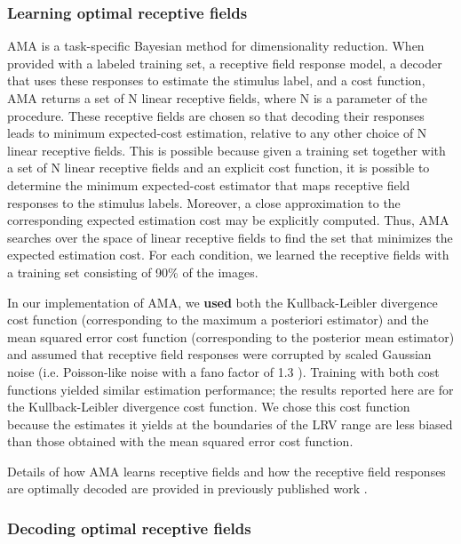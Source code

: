 \documentclass{jov}
\providecommand{\DIFaddtex}[1]{{\bf #1}} %
\providecommand{\DIFdeltex}[1]{} %
\providecommand{\DIFaddbegin}{} %
\providecommand{\DIFaddend}{} %
\providecommand{\DIFdelbegin}{} %
\providecommand{\DIFdelend}{} %
\providecommand{\DIFadd}[1]{\texorpdfstring{\DIFaddtex{#1}}{#1}} %
\providecommand{\DIFdel}[1]{\texorpdfstring{\DIFdeltex{#1}}{}} %
\newcommand{\DIFscaledelfig}{0.5}
\newlength{\DIFdelgraphicswidth} %
\newlength{\DIFdelgraphicsheight} %
\newcommand{\DIFaddincludegraphics}[2][]{{\color{blue}\fbox{\DIFOincludegraphics[#1]{#2}}}} %
\newcommand{\DIFdelincludegraphics}[2][]{%
\sbox{\DIFdelgraphicsbox}{\DIFOincludegraphics[#1]{#2}}%
\settoboxwidth{\DIFdelgraphicswidth}{\DIFdelgraphicsbox} %
\settoboxtotalheight{\DIFdelgraphicsheight}{\DIFdelgraphicsbox} %
\scalebox{\DIFscaledelfig}{%
\parbox[b]{\DIFdelgraphicswidth}{\usebox{\DIFdelgraphicsbox}\\[-\baselineskip] \rule{\DIFdelgraphicswidth}{0em}}\llap{\resizebox{\DIFdelgraphicswidth}{\DIFdelgraphicsheight}{%
\setlength{\unitlength}{\DIFdelgraphicswidth}%
\begin{picture}(1,1)%
\thicklines\linethickness{2pt} %
{\color[rgb]{1,0,0}\put(0,0){\framebox(1,1){}}}%
{\color[rgb]{1,0,0}\put(0,0){\line( 1,1){1}}}%
{\color[rgb]{1,0,0}\put(0,1){\line(1,-1){1}}}%
\end{picture}%
}\hspace*{3pt}}} %
} %
\DeclareRobustCommand{\DIFaddbegin}{\DIFOaddbegin \let\includegraphics\DIFaddincludegraphics} %
\DeclareRobustCommand{\DIFaddend}{\DIFOaddend \let\includegraphics\DIFOincludegraphics} %
\DeclareRobustCommand{\DIFdelbegin}{\DIFOdelbegin \let\includegraphics\DIFdelincludegraphics} %
\DeclareRobustCommand{\DIFdelend}{\DIFOaddend \let\includegraphics\DIFOincludegraphics} %
\begin{document}
\subsubsection*{Learning optimal receptive fields}
AMA is a task-specific Bayesian method for dimensionality reduction.
When provided with a labeled training set, a receptive field response model, a decoder that uses these responses to estimate the stimulus label, and a cost function, AMA returns a set of N linear receptive fields, where N is a parameter of the procedure.
These receptive fields are chosen so that decoding their responses leads to minimum expected-cost estimation, relative to any other choice of N linear receptive fields.
This is possible because given a training set together with a set of N linear receptive fields and an explicit cost function, it is possible to determine the minimum expected-cost estimator that maps receptive field responses to the stimulus labels.
Moreover, a close approximation to the corresponding expected estimation cost may be explicitly computed.
Thus, AMA searches over the space of linear receptive fields to find the set that minimizes the expected estimation cost.
For each condition, we learned the receptive fields with a training set consisting of 90\% of the images.

In our implementation of AMA, we \DIFdelbegin \DIFdel{explored }\DIFdelend \DIFaddbegin \DIFadd{used }\DIFaddend both the Kullback-Leibler divergence cost function (corresponding to the maximum a posteriori estimator) and the mean squared error cost function (corresponding to the posterior mean estimator) and assumed that receptive field responses were corrupted by scaled Gaussian noise (i.e. Poisson-like noise with a fano factor of 1.3 \DIFaddbegin \DIFadd{}\DIFaddend ). 
Training with both cost functions yielded similar estimation performance; the results reported here are for the Kullback-Leibler divergence cost function.
We chose this cost function because the estimates it yields at the boundaries of the LRV range are less biased than those obtained with the mean squared error cost function.

Details of how AMA learns receptive fields and how the receptive field responses are optimally decoded are provided in previously published work \cite{geisler2009optimal,burge2017accuracy,jaini2017linking}.

\subsubsection*{Decoding optimal receptive fields}
\end{document}

